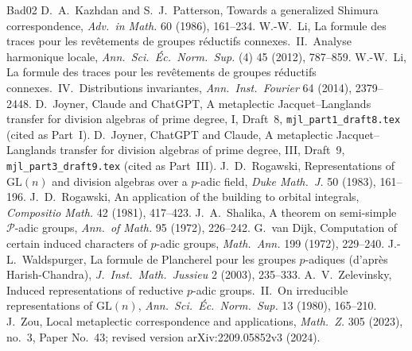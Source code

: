 \documentclass[12pt]{article}
\newcommand{\GL}{\mathrm{GL}}
\theoremstyle{plain}
\theoremstyle{definition}
\begin{document}
\begin{thebibliography}{Bad02}
 D.~A.~Kazhdan and S.~J.~Patterson, Towards a generalized Shimura correspondence, \emph{Adv.\ in Math.} 60 (1986), 161--234.
 W.-W.~Li, La formule des traces pour les rev\^etements de groupes r\'eductifs connexes.\ II.\ Analyse harmonique locale, \emph{Ann.\ Sci.\ \'Ec.\ Norm.\ Sup.} (4) 45 (2012), 787--859.
 W.-W.~Li, La formule des traces pour les rev\^etements de groupes r\'eductifs connexes.\ IV.\ Distributions invariantes, \emph{Ann.\ Inst.\ Fourier} 64 (2014), 2379--2448.
 D.~Joyner, Claude and ChatGPT, A metaplectic Jacquet--Langlands transfer for division algebras of prime degree, I, Draft~8, \texttt{mjl\_part1\_draft8.tex} (cited as Part~I).
 D.~Joyner, ChatGPT and Claude, A metaplectic Jacquet--Langlands transfer for division algebras of prime degree, III, Draft~9, \texttt{mjl\_part3\_draft9.tex} (cited as Part~III).
 J.~D.~Rogawski, Representations of $\GL(n)$ and division algebras over a $p$-adic field, \emph{Duke Math.\ J.} 50 (1983), 161--196.
 J.~D.~Rogawski, An application of the building to orbital integrals, \emph{Compositio Math.} 42 (1981), 417--423.
 J.~A.~Shalika, A theorem on semi-simple $\mathcal P$-adic groups, \emph{Ann.\ of Math.} 95 (1972), 226--242.
 G.~van Dijk, Computation of certain induced characters of $p$-adic groups, \emph{Math.\ Ann.} 199 (1972), 229--240.
 J.-L.~Waldspurger, La formule de Plancherel pour les groupes $p$-adiques (d'apr\`es Harish-Chandra), \emph{J.\ Inst.\ Math.\ Jussieu} 2 (2003), 235--333.
 A.~V.~Zelevinsky, Induced representations of reductive $p$-adic groups.\ II.\ On irreducible representations of $\GL(n)$, \emph{Ann.\ Sci.\ \'Ec.\ Norm.\ Sup.} 13 (1980), 165--210.
 J.~Zou, Local metaplectic correspondence and applications, \emph{Math.\ Z.} 305 (2023), no.~3, Paper No.~43; revised version arXiv:2209.05852v3 (2024).
\end{thebibliography}
\end{document}
